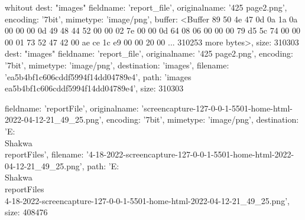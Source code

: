 whitout {dest: "images"}
 {
  fieldname: 'report_file',
  originalname: '425 page2.png',
  encoding: '7bit',
  mimetype: 'image/png',
  buffer: <Buffer 89 50 4e 47 0d 0a 1a 0a 00 00 00 0d 49 48 44 52 00 00 02 7e 00 00 0d 64 08 06 00 00 00 79 d5 5c 74 00 00 00 01 73 52 47 42 00 ae ce 1c e9 00 00 20 00 ... 310253 more bytes>,
  size: 310303
}
{dest: "images"}
{
  fieldname: 'report_file',
  originalname: '425 page2.png',
  encoding: '7bit',
  mimetype: 'image/png',
  destination: 'images',
  filename: 'ea5b4bf1c606cddf5994f14dd04789e4',
  path: 'images\\ea5b4bf1c606cddf5994f14dd04789e4',
  size: 310303
}

{
  fieldname: 'reportFile',
  originalname: 'screencapture-127-0-0-1-5501-home-html-2022-04-12-21_49_25.png',
  encoding: '7bit',
  mimetype: 'image/png',
  destination: 'E:\\Shakwa\\reportFiles',
  filename: '4-18-2022-screencapture-127-0-0-1-5501-home-html-2022-04-12-21_49_25.png',
  path: 'E:\\Shakwa\\reportFiles\\4-18-2022-screencapture-127-0-0-1-5501-home-html-2022-04-12-21_49_25.png',
  size: 408476
}